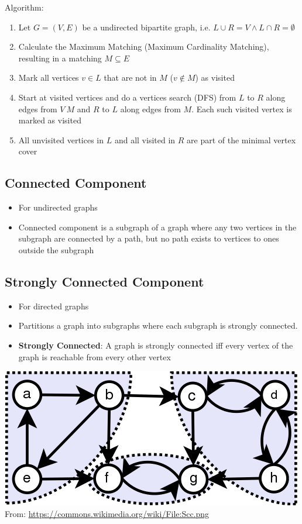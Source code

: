 \documentclass[a4paper,titlepage]{article}
\begin{document}
Algorithm:
\begin{enumerate}
\item Let $G = (V, E)$ be a undirected bipartite graph, i.e. $L \cup R = V \land L \cap R = \emptyset$
\item Calculate the Maximum Matching (Maximum Cardinality Matching), resulting in a matching $M \subseteq E$
\item Mark all vertices $v \in L$ that are not in $M$ ($v \notin M$) as visited
\item Start at visited vertices and do a vertices search (DFS) from $L$ to $R$ along edges from $V \ M$ and $R$ to $L$ along edges from $M$. Each such visited vertex is marked as visited
\item All unvisited vertices in $L$ and all visited in $R$ are part of the minimal vertex cover
\end{enumerate}

\subsection{Connected Component}
\begin{itemize}
\item For undirected graphs
\item Connected component is a subgraph of a graph where any two vertices in the subgraph are connected by a path, but no path exists to vertices to ones outside the subgraph
\end{itemize}

\subsection{Strongly Connected Component}
\begin{itemize}
\item For directed graphs
\item Partitions a graph into subgraphs where each subgraph is strongly connected.
\item \textbf{Strongly Connected}: A graph is strongly connected iff every vertex of the graph is reachable from every other vertex
\end{itemize}

\includegraphics[scale=0.4]{_useful-snippets/graph0.png}\\
From: \url{https://commons.wikimedia.org/wiki/File:Scc.png}
\end{document}
